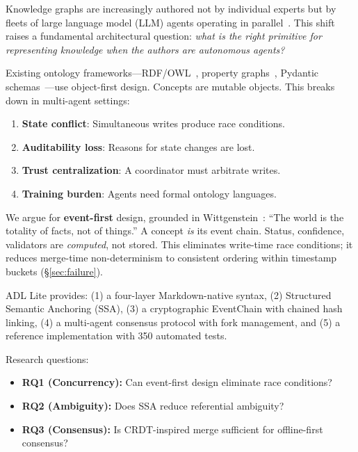 \documentclass[11pt,a4paper]{article}
\theoremstyle{remark}
\begin{document}
Knowledge graphs are increasingly authored not by individual experts but by fleets of large language model (LLM) agents operating in parallel~\cite{pan2024unifying,chen2024agentpoison}. This shift raises a fundamental architectural question: \textit{what is the right primitive for representing knowledge when the authors are autonomous agents?}

Existing ontology frameworks---RDF/OWL~\cite{mcguinness2004owl}, property graphs~\cite{angles2008survey}, Pydantic schemas~\cite{colvin2021pydantic}---use object-first design. Concepts are mutable objects. This breaks down in multi-agent settings:

\begin{enumerate}[label=(\arabic*)]
    \item \textbf{State conflict}: Simultaneous writes produce race conditions.
    \item \textbf{Auditability loss}: Reasons for state changes are lost.
    \item \textbf{Trust centralization}: A coordinator must arbitrate writes.
    \item \textbf{Training burden}: Agents need formal ontology languages.
\end{enumerate}

We argue for \textbf{event-first} design, grounded in Wittgenstein~\cite{wittgenstein1922tractatus}: ``The world is the totality of facts, not of things.'' A concept \textit{is} its event chain. Status, confidence, validators are \textit{computed}, not stored. This eliminates write-time race conditions; it reduces merge-time non-determinism to consistent ordering within timestamp buckets (\S\ref{sec:failure}).

ADL Lite provides: (1) a four-layer Markdown-native syntax, (2) Structured Semantic Anchoring (SSA), (3) a cryptographic EventChain with chained hash linking, (4) a multi-agent consensus protocol with fork management, and (5) a reference implementation with 350 automated tests.

Research questions:
\begin{itemize}
    \item \textbf{RQ1 (Concurrency):} Can event-first design eliminate race conditions?
    \item \textbf{RQ2 (Ambiguity):} Does SSA reduce referential ambiguity?
    \item \textbf{RQ3 (Consensus):} Is CRDT-inspired merge sufficient for offline-first consensus?
\end{itemize}
\end{document}
